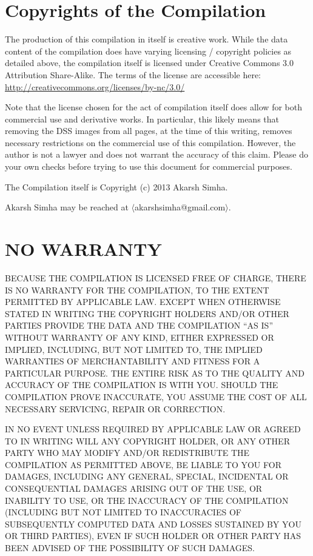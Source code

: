 \section{Copyrights of the Compilation}

The production of this compilation in itself is creative work. While
the data content of the compilation does have varying licensing /
copyright policies as detailed above, the compilation itself is
licensed under Creative Commons 3.0 Attribution Share-Alike. The terms
of the license are accessible here:
\url{http://creativecommons.org/licenses/by-nc/3.0/}

Note that the license chosen for the act of compilation itself does
allow for both commercial use and derivative works. In particular,
this likely means that removing the DSS images from all pages, at the
time of this writing, removes necessary restrictions on the commercial
use of this compilation. However, the author is not a lawyer and does
not warrant the accuracy of this claim. Please do your own checks
before trying to use this document for commercial purposes.

The Compilation itself is Copyright (c) 2013 Akarsh Simha.

Akarsh Simha may be reached at $\langle$akarshsimha@gmail.com$\rangle$.

\section{NO WARRANTY}

  BECAUSE THE COMPILATION IS LICENSED FREE OF CHARGE, THERE IS NO
  WARRANTY FOR THE COMPILATION, TO THE EXTENT PERMITTED BY APPLICABLE
  LAW.  EXCEPT WHEN OTHERWISE STATED IN WRITING THE COPYRIGHT HOLDERS
  AND/OR OTHER PARTIES PROVIDE THE DATA AND THE COMPILATION ``AS IS''
  WITHOUT WARRANTY OF ANY KIND, EITHER EXPRESSED OR IMPLIED,
  INCLUDING, BUT NOT LIMITED TO, THE IMPLIED WARRANTIES OF
  MERCHANTABILITY AND FITNESS FOR A PARTICULAR PURPOSE.  THE ENTIRE
  RISK AS TO THE QUALITY AND ACCURACY OF THE COMPILATION IS WITH YOU.
  SHOULD THE COMPILATION PROVE INACCURATE, YOU ASSUME THE COST OF ALL
  NECESSARY SERVICING, REPAIR OR CORRECTION.

  IN NO EVENT UNLESS REQUIRED BY APPLICABLE LAW OR AGREED TO IN
  WRITING WILL ANY COPYRIGHT HOLDER, OR ANY OTHER PARTY WHO MAY MODIFY
  AND/OR REDISTRIBUTE THE COMPILATION AS PERMITTED ABOVE, BE LIABLE TO
  YOU FOR DAMAGES, INCLUDING ANY GENERAL, SPECIAL, INCIDENTAL OR
  CONSEQUENTIAL DAMAGES ARISING OUT OF THE USE, OR INABILITY TO USE,
  OR THE INACCURACY OF THE COMPILATION (INCLUDING BUT NOT LIMITED TO
  INACCURACIES OF SUBSEQUENTLY COMPUTED DATA AND LOSSES SUSTAINED BY
  YOU OR THIRD PARTIES), EVEN IF SUCH HOLDER OR OTHER PARTY HAS BEEN
  ADVISED OF THE POSSIBILITY OF SUCH DAMAGES.

